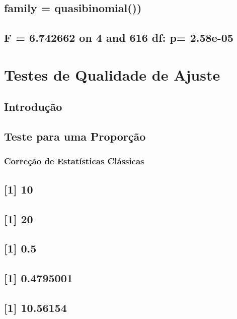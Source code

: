 \documentclass[]{book}
\theoremstyle{definition}
\theoremstyle{definition}
\theoremstyle{definition}
\theoremstyle{remark}
\begin{document}
\section{family = quasibinomial())}\label{family-quasibinomial}

\section{F = 6.742662 on 4 and 616 df: p=
2.58e-05}\label{f-6.742662-on-4-and-616-df-p-2.58e-05}

\chapter{Testes de Qualidade de Ajuste}\label{testqualajust}

\section{Introdução}\label{introducao-1}

\section{Teste para uma Proporção}\label{teste-para-uma-proporcao}

\subsection{Correção de Estatísticas
Clássicas}\label{correcao-de-estatisticas-classicas}

\section{{[}1{]} 10}\label{section-42}

\section{{[}1{]} 20}\label{section-43}

\section{{[}1{]} 0.5}\label{section-44}

\section{{[}1{]} 0.4795001}\label{section-45}

\section{{[}1{]} 10.56154}\label{section-46}
\end{document}
